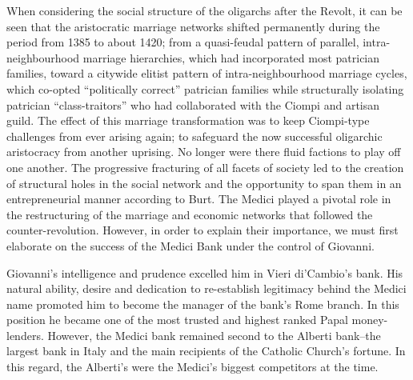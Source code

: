 When considering the social structure of the oligarchs after the Revolt, it can be seen that the aristocratic marriage networks shifted permanently during the period from 1385 to about 1420; from a quasi-feudal pattern of parallel, intra-neighbourhood marriage hierarchies, which had incorporated most patrician families, toward a citywide elitist pattern of intra-neighbourhood marriage cycles, which co-opted ``politically correct'' patrician families while structurally isolating patrician ``class-traitors'' who had collaborated with the Ciompi and artisan guild. The effect of this marriage transformation was to keep Ciompi-type challenges from ever arising again; to safeguard the now successful oligarchic aristocracy from another uprising. No longer were there fluid factions to play off one another. The progressive fracturing of all facets of society led to the creation of structural holes in the social network and the opportunity to span them in an entrepreneurial manner according to Burt. The Medici played a pivotal role in the restructuring of the marriage and economic networks that followed the counter-revolution. However, in order to explain their importance, we must first elaborate on the success of the Medici Bank under the control of Giovanni.

Giovanni's intelligence and prudence excelled him in Vieri di'Cambio's bank. His natural ability, desire and dedication to re-establish legitimacy behind the Medici name promoted him to become the manager of the bank's Rome branch. In this position he became one of the most trusted and highest ranked Papal money-lenders. However, the Medici bank remained second to the Alberti bank--the largest bank in Italy and the main recipients of the Catholic Church's fortune. In this regard, the Alberti's were the Medici's biggest competitors at the time.


